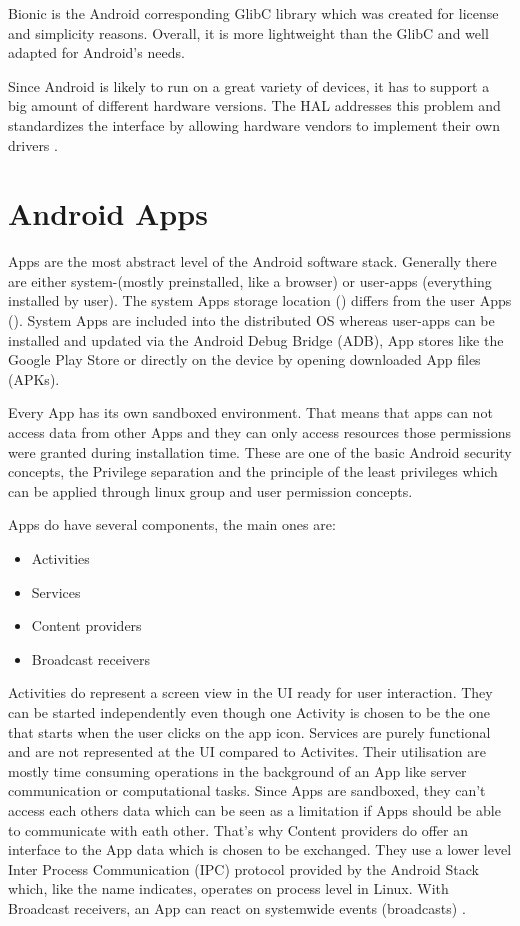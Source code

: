 Bionic is the Android corresponding GlibC library which was created
for license and simplicity reasons. Overall, it is more lightweight
than the GlibC and well adapted for Android's needs.

Since Android is likely to run on a great variety of devices,
it has to support a big amount of different hardware versions.
The HAL addresses this problem and
standardizes the interface by allowing hardware vendors
to implement their own drivers \parencite[p.18f]{levin}.

\section{Android Apps}\label{section:android_apps}
Apps are the most abstract level of the Android software stack.
Generally there are either system-(mostly preinstalled, like a browser)
or user-apps (everything installed by user).
The system Apps storage location () differs from
the user Apps (). System Apps are included into the
distributed OS whereas user-apps can be installed and updated
via the Android Debug Bridge (ADB), App stores
like the Google Play Store or directly on the device by opening
downloaded App files (APKs).

Every App has its own sandboxed environment. That means that
apps can not access data from other Apps and they can only access
resources those permissions were granted during installation time.
These are one of the basic Android security concepts,
the Privilege separation and the principle of the least
privileges \parencite[ch.1]{securityinternals} which can be applied through
linux group and user permission concepts.

Apps do have several components, the main ones are:

\begin{itemize}
\item Activities
\item Services
\item Content providers
\item Broadcast receivers
\end{itemize}

Activities do represent a screen view in the UI ready for user
interaction. They can be started independently even though one Activity
is chosen to be the one that starts when the user clicks on the
app icon. Services are purely functional and are not represented
at the UI compared to Activites. Their utilisation are mostly time
consuming operations in the background of an App like server
communication or computational tasks. Since Apps are sandboxed,
they can't access each others data which can be seen as a limitation
if Apps should be able to communicate with eath other.
That's why Content providers do offer an interface to the App
data which is chosen to be exchanged.
They use a lower level Inter Process Communication (IPC) protocol
provided by the Android Stack which, like the name indicates, operates
on process level in Linux.
With Broadcast receivers, an App can react on systemwide events
(broadcasts) \parencite[ch.1]{securityinternals}.

